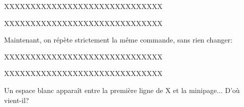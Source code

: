 \documentclass{article}
\begin{document}

XXXXXXXXXXXXXXXXXXXXXXXXXXXXXX


XXXXXXXXXXXXXXXXXXXXXXXXXXXXXX


Maintenant, on répète strictement la même commande, sans rien changer:%

XXXXXXXXXXXXXXXXXXXXXXXXXXXXXX


XXXXXXXXXXXXXXXXXXXXXXXXXXXXXX

Un espace blanc apparaît entre la première ligne de X et la minipage... D’où
vient-il?
\end{document}
